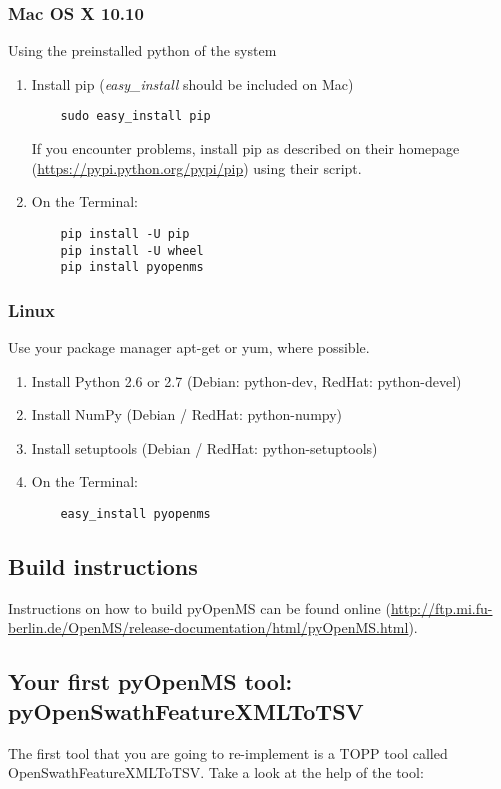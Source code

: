 {\subsubsection{Mac OS X 10.10}
Using the preinstalled python of the system 
\begin{enumerate}
  \item Install pip (\textit{easy\_install} should be included on Mac)
    \begin{lstlisting}
    sudo easy_install pip
    \end{lstlisting} 
    If you encounter problems, install pip as described on their homepage
    (\url{https://pypi.python.org/pypi/pip}) using their script.
  \item On the Terminal:
    \begin{lstlisting}
    pip install -U pip
	pip install -U wheel
	pip install pyopenms
    \end{lstlisting}
\end{enumerate}

\subsubsection{Linux}
Use your package manager apt-get or yum, where possible.
\begin{enumerate}
  \item Install Python 2.6 or 2.7 (Debian: python-dev, RedHat: python-devel)
  \item Install NumPy (Debian / RedHat: python-numpy)
  \item Install setuptools (Debian / RedHat: python-setuptools)
  \item On the Terminal:
    \begin{lstlisting}
    easy_install pyopenms
    \end{lstlisting}
\end{enumerate}

\subsection{Build instructions}
Instructions on how to build pyOpenMS can be found online (\url{http://ftp.mi.fu-berlin.de/OpenMS/release-documentation/html/pyOpenMS.html}).

\subsection{Your first pyOpenMS tool: pyOpenSwathFeatureXMLToTSV}
The first tool that you are going to re-implement is a TOPP tool called OpenSwathFeatureXMLToTSV. Take a look at the help of the tool:

}
